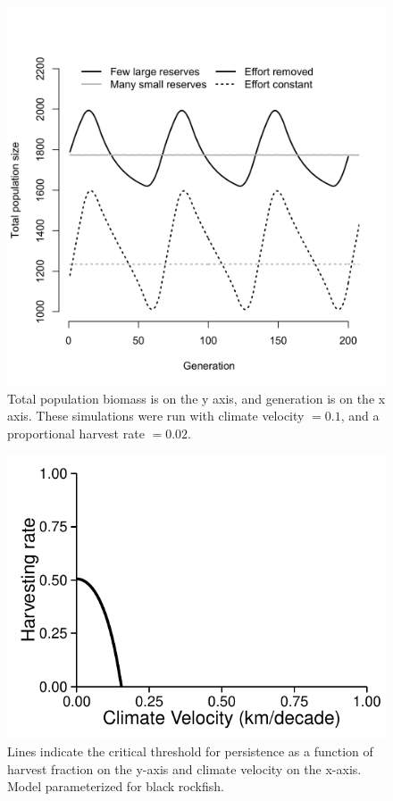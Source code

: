 \documentclass[12pt,english]{article}
\begin{document}
\begin{figure}[h]
\centering
\includegraphics[width=.75\textwidth]{../../plots/compare_flucts.png}
\caption{\label{fluctuations} Total population biomass is on the y axis, and generation is on the x axis. These simulations were run with climate velocity $ = 0.1$, and a proportional harvest rate $= 0.02$. }
\end{figure}

\begin{figure}[h]
\centering
\includegraphics[width=.75\textwidth]{../../plots/rockfish_criticalh.pdf}
\caption{ \label{crith_rockfish}
Lines indicate the critical threshold for persistence as a function of harvest fraction on the y-axis and climate velocity on the x-axis. Model parameterized for black rockfish. }
 \end{figure}
 
\end{document}
